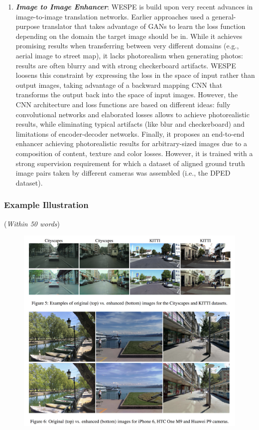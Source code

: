 \documentclass[11pt]{article}
\begin{document}
\begin{enumerate}
\item {\em \textbf{Image to Image Enhancer}}: WESPE is build upon very recent advances in image-to-image
translation networks. Earlier approaches used a
general-purpose translator that takes advantage of GANs to
learn the loss function depending on the domain the target
image should be in. While it achieves promising results when
transferring between very different domains (e.g., aerial image
to street map), it lacks photorealism when generating
photos: results are often blurry and with strong checkerboard
artifacts. 
WESPE loosens this constraint by expressing the loss
in the space of input rather than output images, taking advantage
of a backward mapping CNN that transforms the output
back into the space of input images. However, the CNN architecture and loss functions
are based on different ideas: fully convolutional networks
and elaborated losses allows to achieve photorealistic
results, while eliminating typical artifacts (like blur and
checkerboard) and limitations of encoder-decoder networks.
Finally, it proposes an end-to-end enhancer
achieving photorealistic results for arbitrary-sized images
due to a composition of content, texture and color
losses. However, it is trained with a strong supervision requirement
for which a dataset of aligned ground truth image
pairs taken by different cameras was assembled (i.e., the
DPED dataset).

\end{enumerate}

\subsubsection{Example Illustration}
({\em Within 50 words}) \\

\begin{figure}
	\centering
	\includegraphics[width=\textwidth]{WPL/WESPE1.png}
\end{figure}
\end{document}
